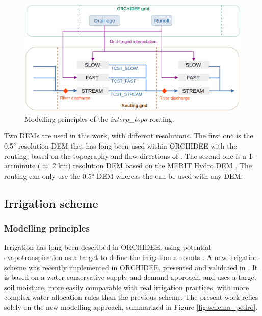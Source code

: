 \begin{figure}[ht]
    \centering
    \includegraphics[width=1\textwidth]{images/methods/routing_principles.png}
    \caption{Modelling principles of the \textit{interp\_topo} routing.}
    \label{fig:routing_principles}
\end{figure}

Two DEMs are used in this work, with different resolutions. 
The first one is the 0.5° resolution DEM that has long been used within ORCHIDEE with the \std routing, based on the topography and flow directions of \citet{vorosmarty_geomorphometric_2000}.
The second one is a 1-arcminute ($\approx$ 2 km) resolution DEM based on the MERIT Hydro DEM \citep{yamazaki_merit_2019}.
The \std routing can only use the 0.5° DEM whereas the \native can be used with any DEM.


\subsection{Irrigation scheme}
\label{sec:irrig_methods}
\subsubsection{Modelling principles}

Irrigation has long been described in ORCHIDEE, using potential evapotranspiration as a target to define the irrigation amounts \citep{de_rosnay_integrated_2003, guimberteau_global_2012}. A new irrigation scheme was recently implemented in ORCHIDEE, presented and validated in \citet{arboleda-obando_validation_2024}. It is based on a water-conservative supply-and-demand approach, and uses a target soil moisture, more easily comparable with real irrigation practices, with more complex water allocation rules than the previous scheme. The present work relies solely on the new modelling approach, summarized in Figure \ref{fig:schema_pedro}.

